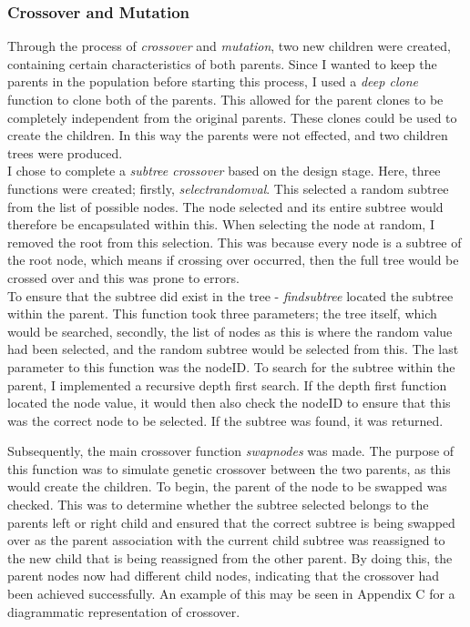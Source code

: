 \documentclass[11pt]{article}
\begin{document}
\subsubsection{Crossover and Mutation}\label{subsubsec:CM}
Through the process of \textit{crossover} and \textit{mutation}, two new children were created, containing certain characteristics of both parents. Since I wanted to keep the parents in the population before starting this process, I used a \textit{deep clone} function to clone both of the parents. This allowed for the parent clones to be completely independent from the original parents. These clones could be used to create the children. In this way the parents were not effected, and two children trees were produced. \\

I chose to complete a \textit{subtree crossover} based on the design stage. Here, three functions were created; firstly, \textit{select\textunderscore random\textunderscore val}. This selected a random subtree from the list of possible nodes. The node selected and its entire subtree would therefore be encapsulated within this. When selecting the node at random, I removed the root from this selection. This was because every node is a subtree of the root node, which means if crossing over occurred, then the full tree would be crossed over and this was prone to errors. \\

To ensure that the subtree did exist in the tree - \textit{find\textunderscore subtree} located the subtree within the parent. This function took three parameters; the tree itself, which would be searched, secondly, the list of nodes as this is where the random value had been selected, and the random subtree would be selected from this. The last parameter to this function was the nodeID. To search for the subtree within the parent, I implemented a recursive depth first search. If the depth first function located the node value, it would then also check the nodeID to ensure that this was the correct node to be selected. If the subtree was found, it was returned.

Subsequently, the main crossover function \textit{swap\textunderscore nodes} was made. The purpose of this function was to simulate genetic crossover between the two parents, as this would create the children. To begin, the parent of the node to be swapped was checked. This was to determine whether the subtree selected belongs to the parents left or right child and ensured that the correct subtree is being swapped over as the parent association with the current child subtree was reassigned to the new child that is being reassigned from the other parent. By doing this, the parent nodes now had different child nodes, indicating that the crossover had been achieved successfully. An example of this may be seen in Appendix C for a diagrammatic representation of crossover. 
\end{document}
